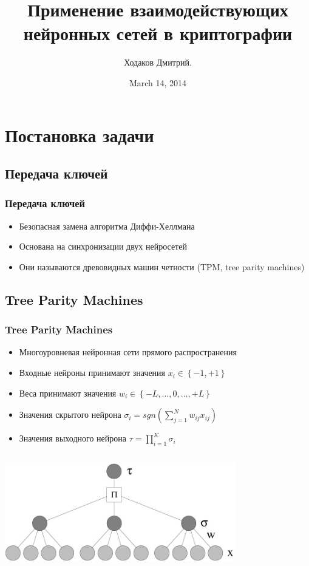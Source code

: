 \documentclass{beamer}
\title{Применение взаимодействующих нейронных сетей в криптографии}
\author{Ходаков Дмитрий.}
\date{March 14, 2014} %
\begin{document}
\frame{\titlepage}
\frame{\tableofcontents}

\section{Постановка задачи}

\subsection{Передача ключей}

\begin{frame}
\frametitle{Передача ключей}
\begin{itemize}
\item Безопасная замена алгоритма Диффи-Хеллмана
\item Основана на синхронизации двух нейросетей
\item Они называются древовидных машин четности (TPM, tree parity machines)
\end{itemize} 
\end{frame}

\subsection{Tree Parity Machines}

\begin{frame}
\frametitle{Tree Parity Machines}
\begin{itemize}
\item Многоуровневая нейронная сети прямого распространения
\item Входные нейроны принимают значения \(x_{i} \in \left\{ -1,+1 \right\}\)
\item Веса принимают значения \(w_{i} \in \left\{-L,...,0,...,+L \right\}\)
\item Значения скрытого нейрона \(\sigma_i=sgn(\sum_{j=1}^{N}w_{ij}x_{ij})\)
\item Значения выходного нейрона \(\tau=\prod_{i=1}^{K}\sigma_i\)
\end{itemize} 
\begin{center}
\includegraphics[width=10cm, height=5cm]{../../pics/tpmv2.jpg}
\end{center}
\end{frame}
\end{document}
